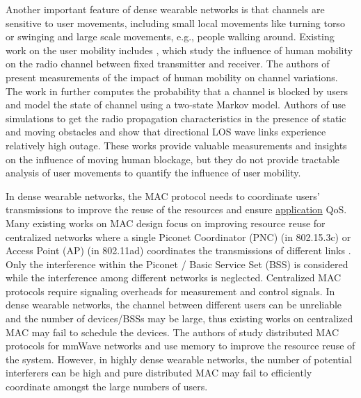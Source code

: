\documentclass[10pt, conference, letterpaper]{IEEEtran}
\begin{document}
Another important feature of dense wearable networks is that channels are sensitive to user movements, including small local movements like turning torso or swinging and large scale movements, e.g., people walking around. Existing work on the user mobility includes \cite{humanactivity}\cite{blockagein60ghz}\cite{timevaryingpathshadowing}, which study the influence of human mobility on the radio channel between fixed transmitter and receiver. The authors of \cite{humanactivity}\cite{timevaryingpathshadowing} present measurements of the impact of human mobility on channel variations. The work in \cite{timevaryingpathshadowing} further computes the probability that a channel is blocked by users and model the state of channel using a two-state Markov model. 
Authors of \cite{blockagein60ghz} use simulations to get the radio propagation characteristics in the presence of static and moving obstacles and show that directional LOS wave links experience relatively high outage. These works provide valuable measurements and insights on the influence of moving human blockage, but they do not provide tractable analysis of user movements to quantify the influence of user mobility.

In dense wearable networks, the MAC protocol needs to coordinate users' transmissions to improve the reuse of the resources and ensure \underline{application} QoS. Many existing works on MAC design focus on improving resource reuse for centralized networks where a single Piconet Coordinator (PNC) (in 802.15.3c) or Access Point (AP) (in 802.11ad) coordinates the transmissions of different links \cite{virtualtimeslot}\cite{rex}\cite{fdmac}. Only the interference within the Piconet / Basic Service Set (BSS) is considered while the interference among different networks is neglected. Centralized MAC protocols require signaling overheads for measurement and control signals. In dense wearable networks, the channel between different users can be unreliable and the number of devices/BSSs may be large, thus existing works on centralized MAC may fail to schedule the devices. The authors of \cite{dtdmac}\cite{mdmac} study distributed MAC protocols for mmWave networks and use memory to improve the resource reuse of the system. However, in highly dense wearable networks, the number of potential interferers can be high and pure distributed MAC may fail to efficiently coordinate amongst the large numbers of users. 
\end{document}
